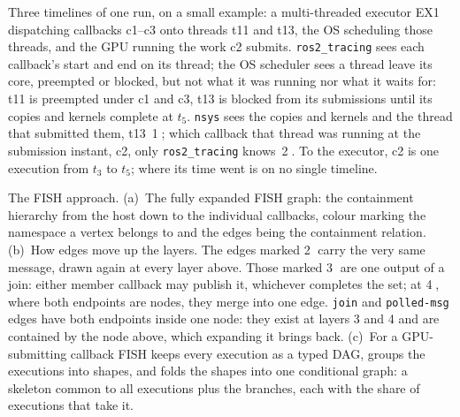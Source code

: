 
\caption{Three timelines of one run, on a small example: a multi-threaded
executor EX1 dispatching callbacks c1--c3 onto threads t11 and t13, the OS
scheduling those threads, and the GPU running the work c2 submits.
\texttt{ros2\_tracing} sees each callback's start and end on its thread; the
OS scheduler sees a thread leave its core, preempted or blocked, but not what
it was running nor what it waits for: t11 is preempted under c1 and c3, t13
is blocked from its submissions until its copies and kernels complete at
$t_5$. \texttt{nsys} sees the copies and kernels and the thread that
submitted them, t13~\textcircled{\scriptsize 1}; which callback that thread
was running at the submission instant, c2, only \texttt{ros2\_tracing}
knows~\textcircled{\scriptsize 2}. To the executor, c2 is one execution from
$t_3$ to $t_5$; where its time went is on no single timeline.}

\caption{The FISH approach. (a)~The fully expanded FISH graph: the
containment hierarchy from the host down to the individual callbacks, colour
marking the namespace a vertex belongs to and the edges being the containment
relation. (b)~How edges move up the layers. The edges marked
\textcircled{\scriptsize 2} carry the very same message, drawn again at every
layer above. Those marked \textcircled{\scriptsize 3} are one output of a
join: either member callback may publish it, whichever completes the set; at
\textcircled{\scriptsize 4}, where both endpoints are nodes, they merge into
one edge. \texttt{join} and \texttt{polled-msg} edges have both endpoints
inside one node: they exist at layers 3 and 4 and are contained by the node
above, which expanding it brings back. (c)~For a GPU-submitting callback FISH
keeps every execution as a typed DAG, groups the executions into shapes, and
folds the shapes into one conditional graph: a skeleton common to all
executions plus the branches, each with the share of executions that take
it.}
